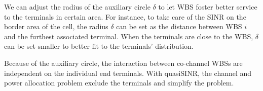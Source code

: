 We can adjust the radius of the auxiliary circle $\delta$ to let WBS foster better service to the terminals in certain area.
For instance, to take care of the SINR on the border area of the cell, the radius $\delta$ can be set as the distance between WBS $i$ and the furthest associated terminal.
When the terminals are close to the WBS, $\delta$ can be set smaller to better fit to the terminals' distribution.




Because of the auxiliary circle, the interaction between co-channel WBSs are independent on the individual end terminals. 
With quasiSINR, the channel and power allocation problem exclude the terminals and simplify the problem. 

